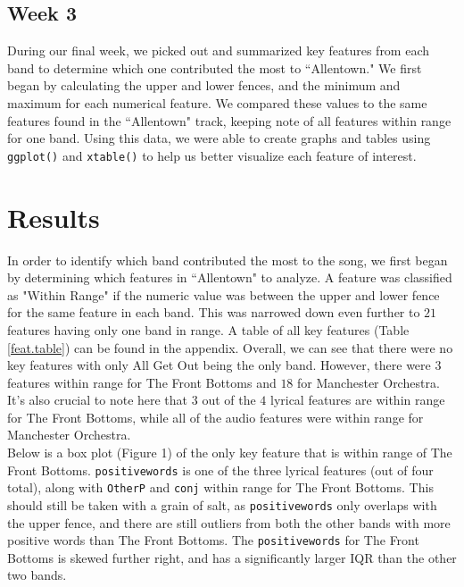 \documentclass{article}\usepackage[]{graphicx}\usepackage[]{xcolor}
\begin{document}
\begin{multicols}{2}
\subsection{Week 3}
During our final week, we picked out and summarized key features from each band to determine which one contributed the most to ``Allentown." We first began by calculating the upper and lower fences, and the minimum and maximum for each numerical feature. We compared these values to the same features found in the ``Allentown" track, keeping note of all features within range for one band. Using this data, we were able to create graphs and tables using \verb|ggplot()| and \verb|xtable()| to help us better visualize each feature of interest. 
\section{Results}
In order to identify which band contributed the most to the song, we first began by determining which features in ``Allentown" to analyze. A feature was classified as "Within Range" if the numeric value was between the upper and lower fence for the same feature in each band. This was narrowed down even further to $21$ features having only one band in range. A table of all key features (Table \ref{feat.table}) can be found in the appendix. Overall, we can see that there were no key features with only All Get Out being the only band. However, there were $3$ features within range for The Front Bottoms and $18$ for Manchester Orchestra. It's also crucial to note here that $3$ out of the $4$ lyrical features are within range for The Front Bottoms, while all of the audio features were within range for Manchester Orchestra. \\
\indent Below is a box plot (Figure 1) of the only key feature that is within range of The Front Bottoms. \texttt{positivewords} is one of the three lyrical features (out of four total), along with \texttt{OtherP} and \texttt{conj} within range for The Front Bottoms. This should still be taken with a grain of salt, as \texttt{positivewords} only overlaps with the upper fence, and there are still outliers from both the other bands with more positive words than The Front Bottoms. The \texttt{positivewords} for The Front Bottoms is skewed further right, and has a significantly larger IQR than the other two bands. \\


\end{multicols}
\end{document}
